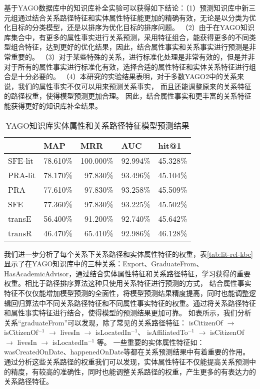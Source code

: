 基于YAGO数据库中的知识库补全实验可以获得如下结论：（1）预测知识库中新三元组通过结合关系路径特征和实体属性特征能更加的精确有效，无论是以分类为优化目标的分类模型，还是以排序为优化目标的排序问题。
（2）由于在YAGO知识库集合中，有更多的属性事实进行关系预测，采用特征组合，能获得更多的不同类型组合特征，达到更好的优化结果，因此，结合属性事实和关系事实进行预测是非常重要的。
（3）对于某些特殊的关系，进行标准化处理是非常有效的，但是并非对于所有的属性事实进行标准化有效，选择合适的属性特征和实体关系特征进行组合是十分必要的。
（4）本研究的实验结果表明，对于多数YAGO2中的关系来说，我们的属性事实不仅可以用来预测关系事实，
而且还能调整原来的关系特征的路径权重，使得模型预测更加合理。
因此，结合属性事实和更丰富的关系特征能获得更好的知识库补全结果。
\begin{table}[htbp]
  \centering
  \caption{YAGO知识库实体属性和关系路径特征模型预测结果}
    \begin{tabular}{|l|r|r|r|r|}
    \hline
          & \multicolumn{1}{l|}{MAP} & \multicolumn{1}{l|}{MRR} & \multicolumn{1}{l|}{AUC} & \multicolumn{1}{l|}{hit@1} \\
    \hline
    SFE-lit & 78.610\% & 100.000\% & 92.994\% & 45.328\% \\
    \hline
    PRA-lit & 78.170\% & 97.830\% & 93.496\% & 45.104\% \\
    \hline
    PRA   & 77.610\% & 97.830\% & 93.258\% & 45.509\% \\
    \hline
    SFE   & 77.360\% & 97.830\% & 93.225\% & 45.502\% \\
    \hline
    transE & 56.400\% & 91.200\% & 92.740\% & 45.642\% \\
    \hline
    transR & 46.470\% & 65.410\% & 92.986\% & 46.128\% \\
    \hline
    \end{tabular}%
  \label{tab:addlabel}%
\end{table}%


我们进一步分析了每个关系下关系路径和实体属性特征的权重，表\ref{tab:lit-rel-kbc}显示了在YAGO知识库中的三种关系：Export、GraduateFrom、HasAcademicAdvisor，通过结合实体属性特征和关系路径特征，学习获得的重要权重。相比于路径排序算法这种只使用关系特征进行预测的方式，
结合属性事实特征不仅仅能增加模型预测的全面性，将模型预测结果精度提高，同时也能调整逻辑回归算法中不同关系路径特征和不同属性事实特征的权重。通过将关系路径特征和属性事实特征进行结合，使得模型的预测结果更加可靠。
如表所示，我们分析关系“graduateFrom”可以发现，除了常见的关系路径特征：
isCitizenOf $\to$ isCitizenOf$^{-1}$ $\to$ livesIn $\to$ isLocatedIn$^{-1}$、
isAffiliatedTo$^{-1}$ $\to$ isCitizenOf $\to$ livesIn $\to$ isLocatedIn$^{-1}$
等。
一些重要的实体属性特征如：wasCreatedOnDate、happenedOnDate等都在关系预测结果中有着重要的作用。通过分析这些关系路径的权重我们可以发现，实体属性特征不仅能提高关系预测中的精度，有较高的准确性，同时也能调整关系路径的权重，产生更多的有表达力的关系路径特征。

